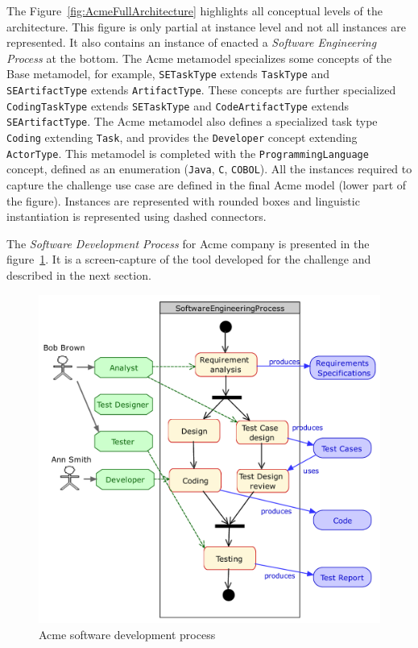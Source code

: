 The Figure~\ref{fig:AcmeFullArchitecture} highlights all conceptual levels of the architecture. This figure is only partial at instance level and not all instances are represented. It also contains an instance of enacted a \textit{Software Engineering Process} at the bottom. The Acme metamodel specializes some concepts of the Base metamodel, for example, \texttt{SETaskType} extends \texttt{TaskType} and \texttt{SEArtifactType} extends \texttt{ArtifactType}. These concepts are further specialized  \texttt{CodingTaskType} extends \texttt{SETaskType} and \texttt{CodeArtifactType} extends \texttt{SEArtifactType}.
The Acme metamodel also defines a specialized task type \texttt{Coding} extending \texttt{Task}, and provides the \texttt{Developer} concept extending \texttt{ActorType}. This metamodel is completed with the \texttt{ProgrammingLanguage} concept, defined as an enumeration (\texttt{Java}, \texttt{C}, \texttt{COBOL}). All the instances required to capture the challenge use case are defined in the final Acme model (lower part of the figure). Instances are represented with rounded boxes and linguistic instantiation is represented using dashed connectors.

The \textit{Software Development Process} for Acme company is presented in the figure~\ref{fig:AcmeSoftwareDevelopmentProcess}. It is a screen-capture of the tool developed for the challenge and described in the next section.

\begin{figure}[t]
 \centering
    \includegraphics[width=1.0 \columnwidth]{Figures/SoftwareEngineeringProcessCroped.pdf}
     \caption{Acme software development process}
    \label{fig:AcmeSoftwareDevelopmentProcess}
\end{figure}

